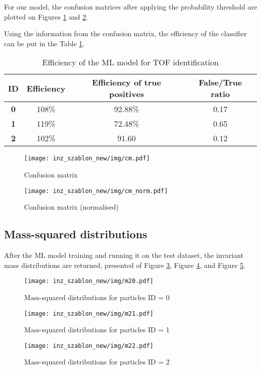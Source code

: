 For our model, the confusion matrices after applying the probability threshold are plotted on Figures \ref{cm} and \ref{cm_norm}.

Using the information from the confusion matrix, the efficiency of the classifier can be put in the Table \ref{tab:tof}.

\begin{table}[H]
    \begin{tabular}{|c|c|c|c|}
    \hline
    \textbf{ID} & \textbf{Efficiency} & \textbf{Efficiency of true positives} & \textbf{False/True ratio} \\ \hline
    \textbf{0} & 108\% & 92.88\% & 0.17 \\ \hline
    \textbf{1} & 119\% & 72.48\% & 0.65 \\ \hline
    \textbf{2} & 102\% & 91.60   & 0.12 \\ \hline
    \end{tabular}
\caption{\label{tab:tof}Efficiency of the ML model for TOF identification}
\end{table}

\begin{figure}[H]
    \centering
    \texttt{[image: inz\_szablon\_new/img/cm.pdf]}
    \caption{Confusion matrix}
    \label{cm}
\end{figure}
\begin{figure}[H]
    \centering
    \texttt{[image: inz\_szablon\_new/img/cm\_norm.pdf]}
    \caption{Confusion matrix (normalised)}
    \label{cm_norm}
\end{figure}

\subsection{Mass-squared distributions}
After the ML model training and running it on the test dataset, the  invariant mass distributions are returned, presented of Figure \ref{mass distr id0}, Figure \ref{mass distr id1}, and Figure \ref{mass distr id2}.

\begin{figure}[h!]
    \centering
    \texttt{[image: inz\_szablon\_new/img/m20.pdf]}
    \caption{Mass-squared distributions for particles ID = 0}
    \label{mass distr id0}
\end{figure}
\begin{figure}[h!]
    \centering
    \texttt{[image: inz\_szablon\_new/img/m21.pdf]}
    \caption{Mass-squared distributions for particles ID = 1}
     \label{mass distr id1}
\end{figure}
\begin{figure}[h!]
    \centering
    \texttt{[image: inz\_szablon\_new/img/m22.pdf]}
    \caption{Mass-squared distributions for particles ID = 2}
     \label{mass distr id2}
\end{figure}

